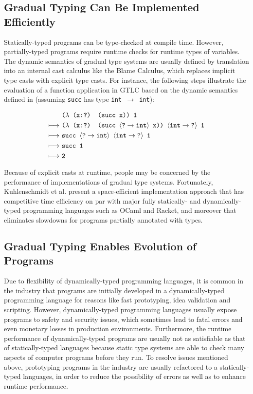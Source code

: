\subsection{Gradual Typing Can Be Implemented Efficiently}
Statically-typed programs can be type-checked at compile time. However, partially-typed programs require runtime checks for runtime types of variables. The dynamic semantics of gradual type systems are usually defined by translation into an internal cast calculus like the Blame Calculus, which replaces implicit type casts with explicit type casts. For instance, the following steps illustrate the evaluation of a function application in GTLC based on the dynamic semantics defined in \cite{siek2006gradual} (assuming {\tt succ} has type {\tt int $\rightarrow$ int}):

\begin{align*}
& \text{\tt ($\lambda$ (x:?) (succ x)) 1} \\
    \longmapsto \ & \text{\tt ($\lambda$ (x:?) (succ $\langle \text{\tt ?} \rightarrow \text{\tt int} \rangle$ x)) $\langle \text{\tt int} \rightarrow \text{\tt ?} \rangle$ 1} \\
    \longmapsto \ & \text{\tt succ $\langle \text{\tt ?} \rightarrow \text{\tt int} \rangle$ $\langle \text{\tt int} \rightarrow \text{\tt ?} \rangle$ 1} \\
    \longmapsto \ & \text{\tt succ 1} \\
    \longmapsto \ & \text{\tt 2}
\end{align*}

Because of explicit casts at runtime, people may be concerned by the performance of implementations of gradual type systems. Fortunately, Kuhlenschmidt et al. \cite{kuhlenschmidt2018efficient} present a space-efficient implementation approach that has competitive time efficiency on par with major fully statically- and dynamically-typed programming languages such as OCaml and Racket, and moreover that eliminates slowdowns for programs partially annotated with types.

\subsection{Gradual Typing Enables Evolution of Programs}
Due to flexibility of dynamically-typed programming languages, it is common in the industry that programs are initially developed in a dynamically-typed programming language for reasons like fast prototyping, idea validation and scripting. However, dynamically-typed programming languages usually expose programs to safety and security issues, which sometimes lead to fatal errors and even monetary losses in production environments. Furthermore, the runtime performance of dynamically-typed programs are usually not as satisfiable as that of statically-typed languages because static type systems are able to check many aspects of computer programs before they run. To resolve issues mentioned above, prototyping programs in the industry are usually refactored to a statically-typed languages, in order to reduce the possibility of errors as well as to enhance runtime performance.

